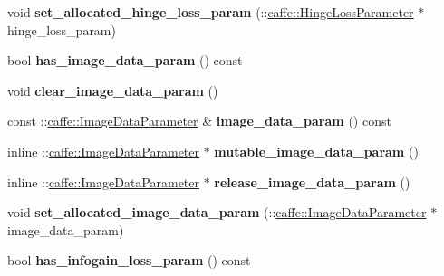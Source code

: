 \begin{DoxyCompactItemize}
void {\bfseries set\+\_\+allocated\+\_\+hinge\+\_\+loss\+\_\+param} (\+::\mbox{\hyperlink{classcaffe_1_1_hinge_loss_parameter}{caffe\+::\+Hinge\+Loss\+Parameter}} $\ast$hinge\+\_\+loss\+\_\+param)
\item 
\mbox{\label{classcaffe_1_1_v1_layer_parameter_a266ccfcd34a511564a06727424307f6f}} 
bool {\bfseries has\+\_\+image\+\_\+data\+\_\+param} () const
\item 
\mbox{\label{classcaffe_1_1_v1_layer_parameter_a32dc65ac01d96eeb734d936271fc99ba}} 
void {\bfseries clear\+\_\+image\+\_\+data\+\_\+param} ()
\item 
\mbox{\label{classcaffe_1_1_v1_layer_parameter_a43d4be121e4efe0625a93465e5c884f4}} 
const \+::\mbox{\hyperlink{classcaffe_1_1_image_data_parameter}{caffe\+::\+Image\+Data\+Parameter}} \& {\bfseries image\+\_\+data\+\_\+param} () const
\item 
\mbox{\label{classcaffe_1_1_v1_layer_parameter_a38c5328e51710a1717c4b6154b11fd4c}} 
inline \+::\mbox{\hyperlink{classcaffe_1_1_image_data_parameter}{caffe\+::\+Image\+Data\+Parameter}} $\ast$ {\bfseries mutable\+\_\+image\+\_\+data\+\_\+param} ()
\item 
\mbox{\label{classcaffe_1_1_v1_layer_parameter_a0169ca8eb3ce05f59056fc467bbbf330}} 
inline \+::\mbox{\hyperlink{classcaffe_1_1_image_data_parameter}{caffe\+::\+Image\+Data\+Parameter}} $\ast$ {\bfseries release\+\_\+image\+\_\+data\+\_\+param} ()
\item 
\mbox{\label{classcaffe_1_1_v1_layer_parameter_a7f0d3f28ef5296013327cfac0040d099}} 
void {\bfseries set\+\_\+allocated\+\_\+image\+\_\+data\+\_\+param} (\+::\mbox{\hyperlink{classcaffe_1_1_image_data_parameter}{caffe\+::\+Image\+Data\+Parameter}} $\ast$image\+\_\+data\+\_\+param)
\item 
\mbox{\label{classcaffe_1_1_v1_layer_parameter_a239d162fe69ba3ac950f6c978ad8c81c}} 
bool {\bfseries has\+\_\+infogain\+\_\+loss\+\_\+param} () const
\item 
\mbox{\label{classcaffe_1_1_v1_layer_parameter_a340e31f9c696d7924e20751f419858b9}} 

\end{DoxyCompactItemize}
